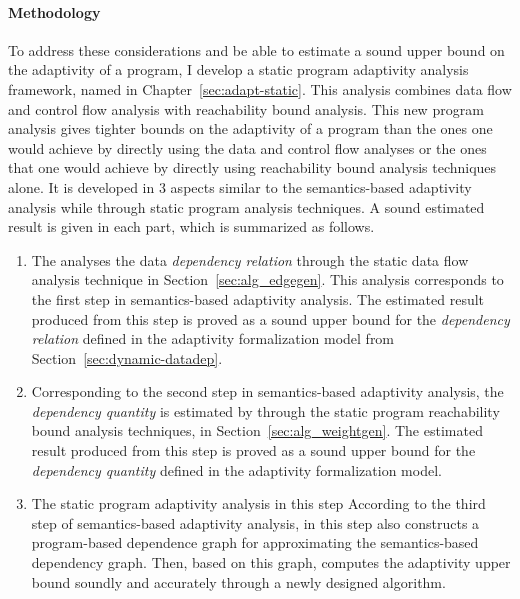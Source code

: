 \paragraph{Methodology}
To address these considerations and be able to estimate a sound upper bound on the adaptivity of a program, 
I develop a static program adaptivity analysis framework, named {\THESYSTEM} in Chapter~\ref{sec:adapt-static}.
This analysis combines data flow and control flow analysis with reachability bound analysis.
This new program analysis gives tighter bounds on the adaptivity of a program than the ones one would achieve 
by directly using the data and control flow analyses or the ones that one would achieve 
by directly using reachability bound analysis techniques alone. 
It is developed in 3 aspects similar to the semantics-based adaptivity analysis 
while through static program analysis techniques. 
A sound estimated result is given in each part, which is summarized as follows.
\begin{enumerate}
\item The {\THESYSTEM} analyses the data \emph{dependency relation} through the static data flow analysis technique in Section~\ref{sec:alg_edgegen}.
This analysis corresponds to the first step in semantics-based adaptivity analysis. 
The estimated result produced from 
this step is proved as a sound upper bound for the \emph{dependency relation} defined in the adaptivity formalization model from Section~\ref{sec:dynamic-datadep}.
\item 
Corresponding to the second step in semantics-based adaptivity analysis, the \emph{dependency quantity} 
is estimated by {\THESYSTEM} through the static program reachability bound analysis techniques, in Section~\ref{sec:alg_weightgen}.
The estimated result produced from 
this step is proved as a sound upper bound for the \emph{dependency quantity} defined in the adaptivity formalization model.
\item 
The static program adaptivity analysis in this step
According to the third step of semantics-based adaptivity analysis, 
{\THESYSTEM} in this step also constructs a program-based dependence graph for approximating the semantics-based dependency graph.
Then, based on this graph, {\THESYSTEM} 
computes the adaptivity upper bound soundly 
and accurately through a newly designed algorithm.
\end{enumerate}